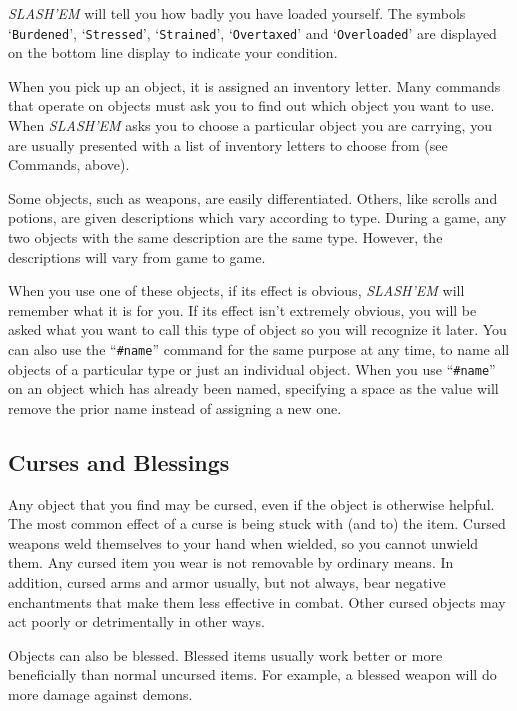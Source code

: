 {\it SLASH'EM\/} will tell you how badly you have loaded yourself.  The symbols
`{\tt Burdened}', `{\tt Stressed}', `{\tt Strained}', `{\tt Overtaxed}' and `{\tt Overloaded}' are
displayed on the bottom line display to indicate your condition.

When you pick up an object, it is assigned an inventory letter.  Many
commands that operate on objects must ask you to find out which object
you want to use.  When {\it SLASH'EM\/} asks you to choose a particular object
you are carrying, you are usually presented with a list of inventory
letters to choose from (see Commands, above).

Some objects, such as weapons, are easily differentiated.  Others, like
scrolls and potions, are given descriptions which vary according to
type.  During a game, any two objects with the same description are
the same type.  However, the descriptions will vary from game to game.

When you use one of these objects, if its effect is obvious, {\it SLASH'EM\/}
will remember what it is for you.  If its effect isn't extremely
obvious, you will be asked what you want to call this type of object
so you will recognize it later.  You can also use the ``{\tt \#name}''
command for the same purpose at any time, to name all objects of a
particular type or just an individual object.
When you use ``{\tt \#name}'' on an object which has already been named,
specifying a space as the value will remove the prior name instead
of assigning a new one.
\subsection*{Curses and Blessings}


Any object that you find may be cursed, even if the object is
otherwise helpful.  The most common effect of a curse is being stuck
with (and to) the item.  Cursed weapons weld themselves to your hand
when wielded, so you cannot unwield them.  Any cursed item you wear
is not removable by ordinary means.  In addition, cursed arms and armor
usually, but not always, bear negative enchantments that make them
less effective in combat.  Other cursed objects may act poorly or
detrimentally in other ways.

Objects can also be blessed.  Blessed items usually work better or
more beneficially than normal uncursed items.  For example, a blessed
weapon will do more damage against demons.

